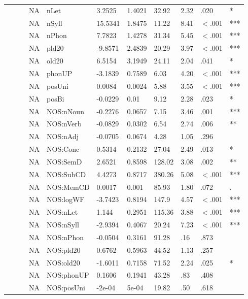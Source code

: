 \begin{table}[ht]
\begin{tabular}{lllllllllll}
   &  &  & NA & nLet & 3.2525 & 1.4021 & 32.92 & 2.32 & .020 & * \\ 
   &  &  & NA & nSyll & 15.5341 & 1.8475 & 11.22 & 8.41 & $<$.001 & *** \\ 
   &  &  & NA & nPhon & 7.7823 & 1.4278 & 31.34 & 5.45 & $<$.001 & *** \\ 
   &  &  & NA & pld20 & -9.8571 & 2.4839 & 20.29 & 3.97 & $<$.001 & *** \\ 
   &  &  & NA & old20 & 6.5154 & 3.1949 & 24.11 & 2.04 & .041 & * \\ 
   &  &  & NA & phonUP & -3.1839 & 0.7589 & 6.03 & 4.20 & $<$.001 & *** \\ 
   &  &  & NA & posUni & 0.0084 & 0.0024 & 5.88 & 3.55 & $<$.001 & *** \\ 
   &  &  & NA & posBi & -0.0229 & 0.01 & 9.12 & 2.28 & .023 & * \\ 
   &  &  & NA & NOS:nNoun & -0.2276 & 0.0657 & 7.15 & 3.46 & .001 & *** \\ 
   &  &  & NA & NOS:nVerb & -0.0829 & 0.0302 & 6.54 & 2.74 & .006 & ** \\ 
   &  &  & NA & NOS:nAdj & -0.0705 & 0.0674 & 4.28 & 1.05 & .296 &   \\ 
   &  &  & NA & NOS:Conc & 0.5314 & 0.2132 & 27.04 & 2.49 & .013 & * \\ 
   &  &  & NA & NOS:SemD & 2.6521 & 0.8598 & 128.02 & 3.08 & .002 & ** \\ 
   &  &  & NA & NOS:SubCD & 4.4273 & 0.8717 & 380.26 & 5.08 & $<$.001 & *** \\ 
   &  &  & NA & NOS:MemCD & 0.0017 & 0.001 & 85.93 & 1.80 & .072 & . \\ 
   &  &  & NA & NOS:logWF & -3.7423 & 0.8194 & 147.9 & 4.57 & $<$.001 & *** \\ 
   &  &  & NA & NOS:nLet & 1.144 & 0.2951 & 115.36 & 3.88 & $<$.001 & *** \\ 
   &  &  & NA & NOS:nSyll & -2.9394 & 0.4067 & 20.24 & 7.23 & $<$.001 & *** \\ 
   &  &  & NA & NOS:nPhon & -0.0504 & 0.3161 & 91.28 & .16 & .873 &   \\ 
   &  &  & NA & NOS:pld20 & 0.6762 & 0.5963 & 44.52 & 1.13 & .257 &   \\ 
   &  &  & NA & NOS:old20 & -1.6011 & 0.7158 & 71.52 & 2.24 & .025 & * \\ 
   &  &  & NA & NOS:phonUP & 0.1606 & 0.1941 & 43.28 & .83 & .408 &   \\ 
   &  &  & NA & NOS:posUni & -2e-04 & 5e-04 & 19.82 & .50 & .618 &   \\ 

\end{tabular}
\end{table}
